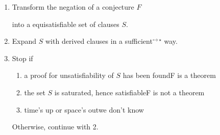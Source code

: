 	\begin{procedure}	
	\begin{enumerate}
	\item Transform the negation of a conjecture $F$
	
	into a equisatisfiable set of clauses $S$.
	\item Expand $S$ with derived clauses 
	in a sufficient$^{\circ\diamond\star}$ way.
	\item Stop if 
	\begin{enumerate}
	\item a proof for unsatisfiability of $S$ has been found\hfill{\colHi F is a theorem}
	\item {\colG the set $S$ is saturated, hence satisfiable}\hfill{\colG F is not a theorem} 
	\item time's up or space's out\hfill \colG we don't know
	\end{enumerate}
	Otherwise, continue with 2.
	\end{enumerate}
	\end{procedure}
	

	
